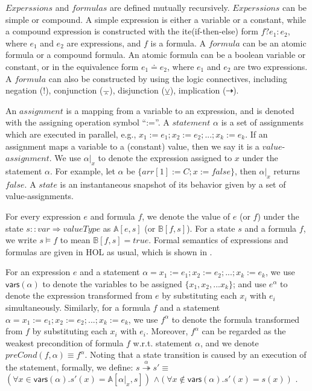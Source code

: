 \documentclass{llncs}
\def \eqc {\doteq }
\def \andc {\barwedge }
\def \negc {!}
\def \orc {\veebar }
\begin{document}

$Experssions$ and $formulas$ are defined mutually recursively. $Experssions$ can be simple or compound. A simple expression is either a variable or a constant, while a compound expression is constructed with the ite(if-then-else) form $f?e_1:e_2$, where $e_1$ and $e_2$ are expressions, and $f$ is a formula.
A $formula$ can be an atomic formula or a compound formula. An atomic formula can be a boolean variable or  constant, or in the equivalence form $e_1\eqc e_2$, where $e_1$ and $e_2$ are two expressions. A $formula$ can also be constructed by using the logic connectives, including negation ($\negc$), conjunction ($\andc$), disjunction ($\orc$), implication ($\dashrightarrow$). %

An $assignment$ is a mapping from a variable to an expression, and is denoted with the assigning operation symbol ``:=''. A $statement$ $\alpha$ is a set of assignments which are executed in parallel, e.g., $ x_1:=e_1;x_2:=e_2;...;x_k:=e_k $. If an assignment maps a variable to a (constant) value, then we say it is a $value$-$assignment$.  We use $\alpha|_x$ to denote the expression assigned to $x$ under the statement $\alpha$. For example, let $\alpha$ be $\{arr[1]:=C;x:=false\}$, then $\alpha|_x$ returns $false$. A $state$ is an instantaneous snapshot of its behavior given by a set of value-assignments.




For every expression $e$ and formula $f$, we denote the value of $e$ (or $f$) under the state $s::var \Rightarrow valueType $ as $\mathbb{A}[e,s]$ (or $\mathbb{B}[f,s]$).
For a state $s$ and a formula $f$, we write
$s\models f$ to mean %
$\mathbb{B}[f,s]=true$.
Formal semantics of expressions and formulas are given in HOL  as usual, which is shown in \cite{LiCache16}. %


For an expression $e$ and a statement $\alpha= x_1:=e_1;x_2:=e_2;...;x_k:=e_k $, we use $\mathsf{vars(\alpha)}$ to denote the variables to be assigned $\{x_1,x_2,...x_k\}$; and use $e^{\alpha}$ to denote the expression transformed from $e$ by substituting each $x_i$ with $e_i$ simultaneously.
Similarly, for a formula $f$  and a statement $\alpha= x_1:=e_1;x_2:=e_2;...;x_k:=e_k $, we use $f^{\alpha}$ to denote the formula transformed from $f$ by substituting each $x_i$ with $e_i$.
Moreover, $f^{\alpha}$ can be regarded as the weakest precondition of formula $f$ w.r.t. statement $\alpha$, and we denote $preCond(f,\alpha)\equiv f^{\alpha}$. Noting that a state transition is caused by an execution of the statement, formally, we define: $s\overset{\alpha}{\twoheadrightarrow } s' \equiv$ $(\forall x \in \mathsf{vars}(\alpha). s'(x)= \mathbb{A}[\alpha|_x,s])$ $\wedge (\forall x \notin \mathsf{vars}(\alpha). s'(x)= s(x))$ .
\end{document}
